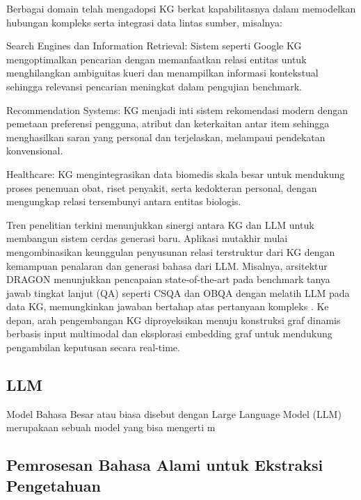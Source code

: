 \begin{subsectcontent}
		Berbagai domain telah mengadopsi KG berkat kapabilitasnya dalam memodelkan hubungan kompleks serta integrasi data lintas sumber, misalnya:
		\begin{packed_item_sub}
			\item Search Engines dan Information Retrieval: Sistem seperti Google KG mengoptimalkan pencarian dengan memanfaatkan relasi entitas untuk menghilangkan ambiguitas kueri dan menampilkan informasi kontekstual sehingga relevansi pencarian meningkat dalam pengujian benchmark.
			\item Recommendation Systems: KG menjadi inti sistem rekomendasi modern dengan pemetaan preferensi pengguna, atribut dan keterkaitan antar item sehingga menghasilkan saran yang personal dan terjelaskan, melampaui pendekatan konvensional.
			\item Healthcare: KG mengintegrasikan data biomedis skala besar untuk mendukung proses penemuan obat, riset penyakit, serta kedokteran personal, dengan mengungkap relasi tersembunyi antara entitas biologis.
		\end{packed_item_sub}
		
		Tren penelitian terkini menunjukkan sinergi antara KG dan LLM untuk membangun sistem cerdas generasi baru. Aplikasi mutakhir mulai mengombinasikan keunggulan penyusunan relasi terstruktur dari KG dengan kemampuan penalaran dan generasi bahasa dari LLM. Misalnya, arsitektur DRAGON \cite{yasunaga2022deepbidirectionallanguageknowledgegraph} menunjukkan pencapaian state-of-the-art pada benchmark tanya jawab tingkat lanjut (QA) seperti CSQA dan OBQA dengan melatih LLM pada data KG, memungkinkan jawaban bertahap atas pertanyaan kompleks \cite{saha2018complexsequentialquestionanswering, mihaylov2018suitarmorconductelectricity}. Ke depan, arah pengembangan KG diproyeksikan menuju konstruksi graf dinamis berbasis input multimodal dan eksplorasi embedding graf untuk mendukung pengambilan keputusan secara real-time.
	\end{subsectcontent}
	
\subsection{LLM}
	\begin{subsectcontent}
		\indent Model Bahasa Besar atau biasa disebut dengan Large Language Model (LLM) merupakaan sebuah model yang bisa mengerti m
	\end{subsectcontent}

\subsection{Pemrosesan Bahasa Alami untuk Ekstraksi Pengetahuan}
	\begin{subsectcontent}
		\indent 
	\end{subsectcontent}
	
